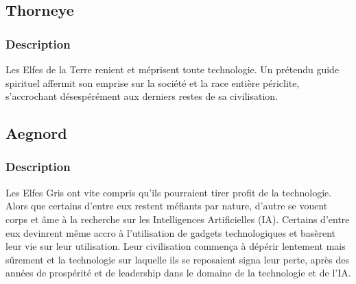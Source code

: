 \subsection{Thorneye}
\subsubsection{Description}
Les Elfes de la Terre renient et méprisent toute technologie. Un prétendu guide spirituel affermit son emprise sur la société et la race entière périclite, s'accrochant désespérément aux derniers restes de sa civilisation.
\subsection{Aegnord} 
\subsubsection{Description}
Les Elfes Gris ont vite compris qu'ils pourraient tirer profit de la technologie. Alors que certains d'entre eux restent méfiants par nature, d'autre se vouent corps et âme à la recherche sur les Intelligences Artificielles (IA). Certains d'entre eux devinrent même accro à l'utilisation de gadgets technologiques et basèrent leur vie sur leur utilisation. Leur civilisation commença à dépérir lentement mais sûrement et la technologie sur laquelle ils se reposaient signa leur perte, après des années de prospérité et de leadership dans le domaine de la technologie et de l'IA.